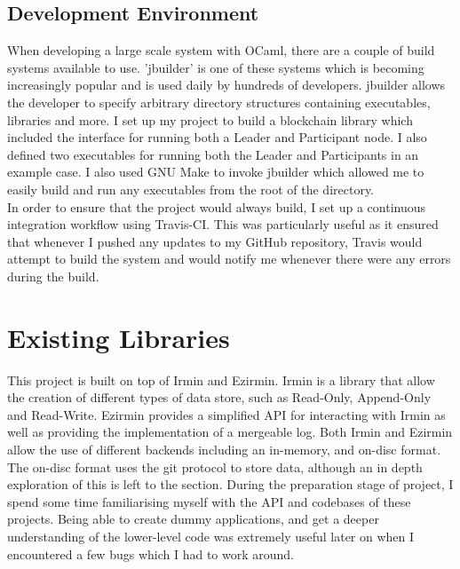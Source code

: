 \documentclass[12pt,a4paper,twoside,openright]{report}
\begin{document}
		\subsection{Development Environment}
		When developing a large scale system with OCaml, there are a couple of build systems available to use. 
		'jbuilder' \cite{jbuilder} is one of these systems which is becoming increasingly popular and is used daily by hundreds of developers.
		jbuilder allows the developer to specify arbitrary directory structures containing executables, libraries and more.
		I set up my project to build a blockchain library which included the interface for running both a Leader and Participant node. 
		I also defined two executables for running both the Leader and Participants in an example case. 
		I also used GNU Make \cite{GNUMake} to invoke jbuilder which allowed me to easily build and run any executables from the root of the directory.\\
		
		In order to ensure that the project would always build, I set up a continuous integration workflow using Travis-CI. 
		This was particularly useful as it ensured that whenever I pushed any updates to my GitHub repository, Travis would attempt to build the system and would notify me whenever there were any errors during the build.

	\section{Existing Libraries}
		This project is built on top of Irmin and Ezirmin.
		Irmin is a library that allow the creation of different types of data store, such as Read-Only, Append-Only and Read-Write.
		Ezirmin provides a simplified API for interacting with Irmin as well as providing the implementation of a mergeable log.
		Both Irmin and Ezirmin allow the use of different backends including an in-memory, and on-disc format. 
		The on-disc format uses the git protocol to store data, although an in depth exploration of this is left to the  section.
		During the preparation stage of project, I spend some time familiarising myself with the API and codebases of these projects. 
		Being able to create dummy applications, and get a deeper understanding of the lower-level code was extremely useful later on when I encountered a few bugs which I had to work around.\\
\end{document}
